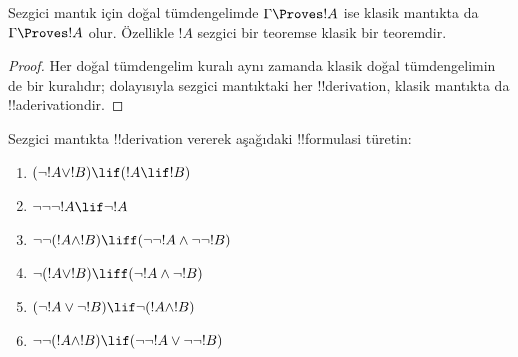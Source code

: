 \documentclass[../../../include/open-logic-section]{subfiles}
\begin{document}
\begin{prop}
  Sezgici mantık için doğal tümdengelimde $\Gamma \Proves !A$ ise klasik
  mantıkta da $\Gamma \Proves !A$ olur. Özellikle $!A$ sezgici bir teoremse
  klasik bir teoremdir.
\end{prop}

\begin{proof}
  Her doğal tümdengelim kuralı aynı zamanda klasik doğal tümdengelimin de bir
  kuralıdır; dolayısıyla sezgici mantıktaki her !!{derivation}, klasik mantıkta
  da !!a{derivation}{}dir.
\end{proof}

\begin{prob}
  Sezgici mantıkta !!{derivation} vererek aşağıdaki !!{formula}s{}i türetin:
  \begin{enumerate}
    \item $(\lnot !A \lor !B) \lif (!A \lif !B)$
    \item $\lnot\lnot\lnot !A \lif \lnot !A$
    \item $\lnot\lnot (!A \land !B) \liff (\lnot\lnot !A\land \lnot \lnot !B)$
    \item $\lnot (!A \lor !B) \liff (\lnot !A \land \lnot !B)$
    \item $(\lnot !A \lor \lnot !B) \lif \lnot (!A \land !B)$
    \item $\lnot\lnot ( !A \land !B) \lif  (\lnot\lnot !A \lor
    \lnot\lnot !B)$
  \end{enumerate}
\end{prob}
\end{document}
